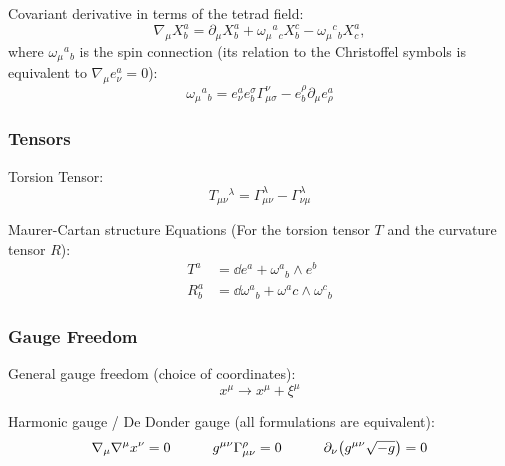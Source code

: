 			\noindent
			Covariant derivative in terms of the tetrad field:
			\begin{equation}
				\nabla_\mu X^a_b = \partial_\mu X^a_b + \omega_\mu{}^a{}_c X^c_b - \omega_\mu{}^c{}_b X^a_c,
			\end{equation}
			where $\omega_\mu{}^a{}_b$ is the spin connection (its relation to the Christoffel symbols is equivalent to $\nabla_\mu e^a_\nu = 0$):
			\begin{equation}
				\omega_\mu{}^a{}_b = e^a_\nu e^\sigma_b \Gamma^\nu_{\mu\sigma} - e^\rho_b \partial_\mu e^a_\rho
			\end{equation}


		\subsubsection{Tensors}
			Torsion Tensor:
			\begin{equation}
				T_{\mu\nu}{}^\lambda = \Gamma_{\mu\nu}^\lambda - \Gamma_{\nu\mu}^\lambda
			\end{equation}

			\noindent
			Maurer-Cartan structure Equations (For the torsion tensor $T$ and the curvature tensor $R$):
			\begin{equation}
				\begin{aligned}
					T^a &= \dd e^a + \omega^a{}_b \wedge e^b \\
					R^a_b &= \dd \omega^a{}_b + \omega^a_{}c \wedge \omega^c{}_b
				\end{aligned}
			\end{equation}

		\subsubsection{Gauge Freedom}
			General gauge freedom (choice of coordinates):
			\begin{equation}
				x^\mu \to x^\mu + \xi^\mu
			\end{equation}

			\noindent
			Harmonic gauge / De Donder gauge (all formulations are equivalent):
			\begin{equation}
				\nabla_\mu \nabla^\mu x^\nu = 0
				\hspace{30pt} g^{\mu\nu} \Gamma^\rho_{\mu\nu} = 0
				\hspace{30pt} \partial_\nu \qty(g^{\mu\nu}\sqrt{-g}) = 0
			\end{equation}


